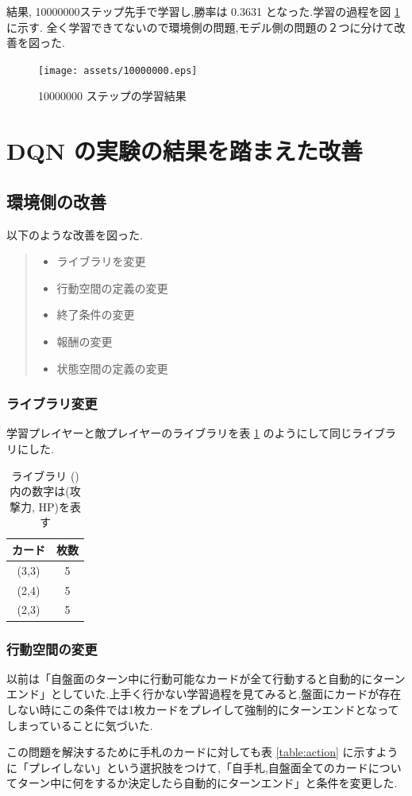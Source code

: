 \documentclass{jarticle}     %
\begin{document}
結果, 10000000ステップ先手で学習し,勝率は 0.3631 となった.学習の過程を図 \ref{fig:10000000} に示す.
全く学習できてないので環境側の問題,モデル側の問題の２つに分けて改善を図った.
\begin{figure}[H]
  \centering
  \texttt{[image: assets/10000000.eps]}
  \caption{10000000 ステップの学習結果}
  \label{fig:10000000}
\end{figure}


\section{DQN の実験の結果を踏まえた改善}
\subsection{環境側の改善}
以下のような改善を図った.
\begin{quote}
  \begin{itemize}
  \item ライブラリを変更
   \item 行動空間の定義の変更
   \item 終了条件の変更
   \item 報酬の変更
   \item 状態空間の定義の変更
  \end{itemize}
 \end{quote}

\subsubsection{ライブラリ変更}
学習プレイヤーと敵プレイヤーのライブラリを表 \ref{table:deck} のようにして同じライブラリにした.
\begin{table}[H]
  \centering
  \caption{ライブラリ ()内の数字は(攻撃力, HP)を表す}
  \label{table:deck}
  \begin{tabular}{|c|c|}
  \hline
  カード   & 枚数 \\ \hline
  (3,3) & 5  \\ \hline
  (2,4) & 5  \\ \hline
  (2,3) & 5  \\ \hline
  \end{tabular}
  \end{table}

\subsubsection{行動空間の変更}
以前は「自盤面のターン中に行動可能なカードが全て行動すると自動的にターンエンド」としていた.上手く行かない学習過程を見てみると,盤面にカードが存在しない時にこの条件では1枚カードをプレイして強制的にターンエンドとなってしまっていることに気づいた.\par
この問題を解決するために手札のカードに対しても表 \ref{table:action} に示すように「プレイしない」という選択肢をつけて,「自手札,自盤面全てのカードについてターン中に何をするか決定したら自動的にターンエンド」と条件を変更した.\par
\end{document}
